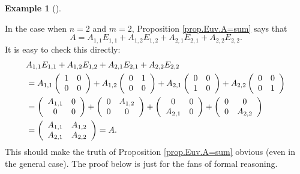 \documentclass[numbers=enddot,12pt,final,onecolumn,notitlepage]{scrartcl}%
\theoremstyle{definition}
\newtheorem{exam}[theo]{Example}
\newenvironment{example}[1][]
{\begin{exam}[#1]\begin{leftbar}}
{\end{leftbar}\end{exam}}
\begin{document}
\begin{example}
In the case when $n=2$ and $m=2$, Proposition \ref{prop.Euv.A=sum} says that%
\[
A=A_{1,1}E_{1,1}+A_{1,2}E_{1,2}+A_{2,1}E_{2,1}+A_{2,2}E_{2,2}.
\]
It is easy to check this directly:%
\begin{align*}
&  A_{1,1}E_{1,1}+A_{1,2}E_{1,2}+A_{2,1}E_{2,1}+A_{2,2}E_{2,2}\\
&  =A_{1,1}\left(
\begin{array}
[c]{cc}%
1 & 0\\
0 & 0
\end{array}
\right)  +A_{1,2}\left(
\begin{array}
[c]{cc}%
0 & 1\\
0 & 0
\end{array}
\right)  +A_{2,1}\left(
\begin{array}
[c]{cc}%
0 & 0\\
1 & 0
\end{array}
\right)  +A_{2,2}\left(
\begin{array}
[c]{cc}%
0 & 0\\
0 & 1
\end{array}
\right) \\
&  =\left(
\begin{array}
[c]{cc}%
A_{1,1} & 0\\
0 & 0
\end{array}
\right)  +\left(
\begin{array}
[c]{cc}%
0 & A_{1,2}\\
0 & 0
\end{array}
\right)  +\left(
\begin{array}
[c]{cc}%
0 & 0\\
A_{2,1} & 0
\end{array}
\right)  +\left(
\begin{array}
[c]{cc}%
0 & 0\\
0 & A_{2,2}%
\end{array}
\right) \\
&  =\left(
\begin{array}
[c]{cc}%
A_{1,1} & A_{1,2}\\
A_{2,1} & A_{2,2}%
\end{array}
\right)  =A.
\end{align*}
This should make the truth of Proposition \ref{prop.Euv.A=sum} obvious (even
in the general case). The proof below is just for the fans of formal reasoning.
\end{example}
\end{document}
